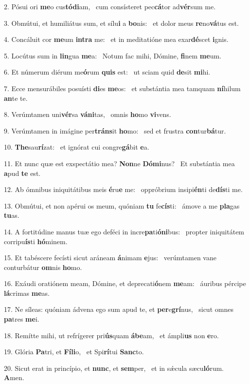 2. Pósui ori \textbf{me}o cus\textbf{tó}\textbf{di}am, \ast\  cum consísteret pec\textbf{cá}tor ad\textbf{vér}sum me.\

3. Obmútui, et humiliátus sum, et sílu\textbf{i} a \textbf{bo}nis: \ast\  et dolor meus \textbf{re}no\textbf{vá}tus est.\

4. Concáluit cor \textbf{me}um \textbf{in}\textbf{tra} me: \ast\  et in meditatióne mea exar\textbf{dé}scet \textbf{i}gnis.\

5. Locútus sum in \textbf{lin}gua \textbf{me}a: \ast\  Notum fac mihi, Dómine, \textbf{fi}nem \textbf{me}um.\

6. Et númerum diérum me\textbf{ó}rum \textbf{quis} est: \ast\  ut sciam quid \textbf{de}sit \textbf{mi}hi.\

7. Ecce mensurábiles posuísti \textbf{di}es \textbf{me}os: \ast\  et substántia mea tamquam \textbf{ní}hilum \textbf{an}te te.\

8. Verúmtamen uni\textbf{vér}sa \textbf{vá}\textbf{ni}tas, \ast\  omnis \textbf{ho}mo \textbf{vi}vens.\

9. Verúmtamen in imágine per\textbf{tráns}it \textbf{ho}mo: \ast\  sed et frustra \textbf{con}tur\textbf{bá}tur.\

10. \textbf{The}sau\textbf{rí}zat: \ast\  et ignórat cui congre\textbf{gá}bit \textbf{e}a.\

11. Et nunc quæ est exspectátio mea? \textbf{Non}ne \textbf{Dó}\textbf{mi}nus? \ast\  Et substántia mea \textbf{a}pud \textbf{te} est.\

12. Ab ómnibus iniquitátibus meis \textbf{é}ru\textbf{e} me: \ast\  oppróbrium insipi\textbf{én}ti de\textbf{dís}ti me.\

13. Obmútui, et non apérui os meum, quóniam \textbf{tu} fe\textbf{cís}ti: \ast\  ámove a me \textbf{pla}gas \textbf{tu}as.\

14. A fortitúdine manus tuæ ego deféci in incre\textbf{pa}ti\textbf{ó}\textbf{ni}bus: \ast\  propter iniquitátem corripu\textbf{ís}ti \textbf{hó}minem.\

15. Et tabéscere fecísti sicut aráneam \textbf{á}nimam \textbf{e}jus: \ast\  verúmtamen vane conturbátur \textbf{om}nis \textbf{ho}mo.\

16. Exáudi oratiónem meam, Dómine, et deprecati\textbf{ó}nem \textbf{me}am: \ast\  áuribus pércipe \textbf{lá}crimas \textbf{me}as.\

17. Ne síleas: quóniam ádvena ego sum apud te, et \textbf{per}e\textbf{grí}nus, \ast\  sicut omnes \textbf{pa}tres \textbf{me}i.\

18. Remítte mihi, ut refrígerer pri\textbf{ús}quam \textbf{á}\textbf{be}am, \ast\  et ámpli\textbf{us} non \textbf{e}ro.\

19. Glória \textbf{Pa}tri, et \textbf{Fí}\textbf{li}o, \ast\  et Spi\textbf{rí}tui \textbf{Sanc}to.\

20. Sicut erat in princípio, et \textbf{nunc}, et \textbf{sem}per, \ast\  et in sǽcula sæcu\textbf{ló}rum. \textbf{A}men.\

